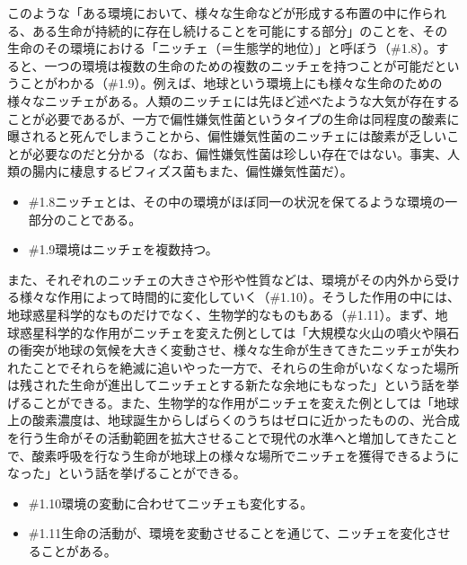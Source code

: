このような「ある環境において、様々な生命などが形成する布置の中に作られる、ある生命が持続的に存在し続けることを可能にする部分」のことを、その生命のその環境における「ニッチェ（＝生態学的地位）」と呼ぼう（\#1.8）。すると、一つの環境は複数の生命のための複数のニッチェを持つことが可能だということがわかる（\#1.9）。例えば、地球という環境上にも様々な生命のための様々なニッチェがある。人類のニッチェには先ほど述べたような大気が存在することが必要であるが、一方で偏性嫌気性菌というタイプの生命は同程度の酸素に曝されると死んでしまうことから、偏性嫌気性菌のニッチェには酸素が乏しいことが必要なのだと分かる（なお、偏性嫌気性菌は珍しい存在ではない。事実、人類の腸内に棲息するビフィズス菌もまた、偏性嫌気性菌だ）。

\begin{note}{}
  \begin{itemize}
    \tightlist
    \item{\#1.8}ニッチェとは、その中の環境がほぼ同一の状況を保てるような環境の一部分のことである。
    \item{\#1.9}環境はニッチェを複数持つ。
  \end{itemize}
\end{note}

また、それぞれのニッチェの大きさや形や性質などは、環境がその内外から受ける様々な作用によって時間的に変化していく（\#1.10）。そうした作用の中には、地球惑星科学的なものだけでなく、生物学的なものもある（\#1.11）。まず、地球惑星科学的な作用がニッチェを変えた例としては「大規模な火山の噴火や隕石の衝突が地球の気候を大きく変動させ、様々な生命が生きてきたニッチェが失われたことでそれらを絶滅に追いやった一方で、それらの生命がいなくなった場所は残された生命が進出してニッチェとする新たな余地にもなった」という話を挙げることができる。また、生物学的な作用がニッチェを変えた例としては「地球上の酸素濃度は、地球誕生からしばらくのうちはゼロに近かったものの、光合成を行う生命がその活動範囲を拡大させることで現代の水準へと増加してきたことで、酸素呼吸を行なう生命が地球上の様々な場所でニッチェを獲得できるようになった」という話を挙げることができる。

\begin{note}{}
  \begin{itemize}
    \tightlist
    \item{\#1.10}環境の変動に合わせてニッチェも変化する。
    \item{\#1.11}生命の活動が、環境を変動させることを通じて、ニッチェを変化させることがある。
  \end{itemize}
\end{note}


